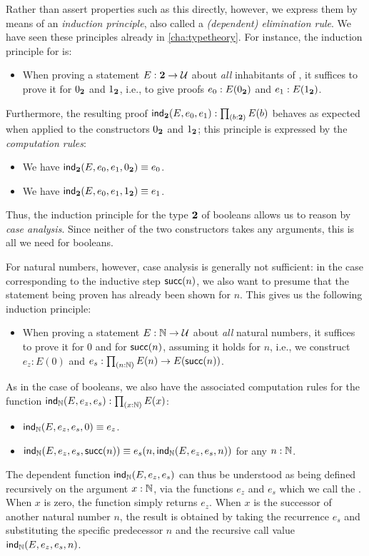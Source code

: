 %
Rather than assert properties such as this directly, however, we express them by means of an \emph{induction principle}, also called a \emph{(dependent) elimination rule}.
We have seen these principles already in \cref{cha:typetheory}.
For instance, the induction principle for \bool is:
%
\begin{itemize}
\item When proving a statement $E : \mathbf{2} \to \mathcal{U}$ about \emph{all} inhabitants of \bool, it suffices to prove it for ${0_{\mathbf{2}}}$ and ${1_{\mathbf{2}}}$, i.e., to give proofs $e_0 : E({0_{\mathbf{2}}})$ and $e_1 : E({1_{\mathbf{2}}})$.
\end{itemize}

Furthermore, the resulting proof $\ind\bool(E,e_0,e_1): \prd{b : \bool}E(b)$ behaves as expected when applied to the constructors ${0_{\mathbf{2}}}$ and ${1_{\mathbf{2}}}$; this principle is expressed by the \emph{computation rules}:
\begin{itemize}
\item We have $\mathsf{ind}_{\mathbf{2}}(E,e_0,e_1,{0_{\mathbf{2}}}) \equiv e_0$.
\item We have $\mathsf{ind}_{\mathbf{2}}(E,e_0,e_1,{1_{\mathbf{2}}}) \equiv e_1$.
\end{itemize}

%
Thus, the induction principle for the type $\mathbf{2}$ of booleans allows us to reason by \emph{case analysis}.
Since neither of the two constructors takes any arguments, this is all we need for booleans.

%
For natural numbers, however, case analysis is generally not sufficient: in the case corresponding to the inductive step $\mathsf{succ}(n)$, we also want to presume that the statement being proven has already been shown for $n$.
This gives us the following induction principle:
\begin{itemize}
\item When proving a statement $E : \mathbb{N} \to \mathcal{U}$ about \emph{all} natural numbers, it suffices to prove it for $0$ and for $\mathsf{succ}(n)$, assuming it holds
for $n$, i.e., we construct $e_z : E(0)$ and $e_s : \prd{n : \nat} E(n) \to E(\suc(n))$.
\end{itemize}
As in the case of booleans, we also have the associated computation rules for the function $\ind\nat(E,e_z,e_s) : \prd{x:\nat} E(x)$:
%
\begin{itemize}
\item $\mathsf{ind}_{\mathbb{N}}(E,e_z,e_s,0) \equiv e_z$.
\item $\mathsf{ind}_{\mathbb{N}}(E,e_z,e_s,\mathsf{succ}(n)) \equiv e_s(n,\mathsf{ind}_{\mathbb{N}}(E,e_z,e_s,n))$ for any $n : \mathbb{N}$.
\end{itemize}
The dependent function $\mathsf{ind}_{\mathbb{N}}(E,e_z,e_s)$ can thus be understood as being defined recursively on the argument $x : \mathbb{N}$, via the functions $e_z$ and $e_s$ which we call the .
When $x$ is zero, the function simply returns $e_z$.
When $x$ is the successor of another natural number $n$, the result is obtained by taking the recurrence $e_s$ and substituting the specific predecessor $n$ and the recursive call value $\mathsf{ind}_{\mathbb{N}}(E,e_z,e_s,n)$.

